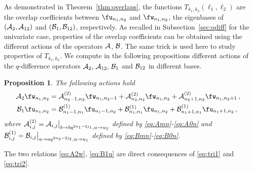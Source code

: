 \documentclass[11pt]{amsart}
\numberwithin{equation}{section}
\newtheorem{prop}[thm]{Proposition}
\numberwithin{equation}{section}
\begin{document}
As demonstrated in Theorem~\ref{thm:overlaps}, the functions $T_{k_1,k_2}(\ell_1,\ell_2)$ are the overlap coefficients between $\fu_{n_1,n_2}$ and $\fw_{n_1,n_2}$, the eigenbases  of $({\cal A}_2,{\cal A}_{12})$ and $({\cal B}_1,{\cal B}_{12})$, respectively. 
As recalled in Subsection~\ref{sec:qdiff} for the univariate case, properties of the overlap coefficients can be obtained using the different actions of the  operators $\cal A$, $\cal B$. The same trick is used here to study properties of   $T_{k_1,k_2}$. 
We compute in the following propositions different actions of the $q$-difference operators  ${\cal A}_2,\, {\cal A}_{12},\,{\cal B}_1$ and ${\cal B}_{12}$ in different bases.
\begin{prop}
   The following actions hold
    \begin{align}
\label{eq:A2w}      {\cal A}_2  \fw_{n_1,n_2}&= {\cal A}^{(2)}_{n_2-1,n_2} \fw_{n_1,n_2-1}+{\cal A}^{(2)}_{n_2,n_2}\fw_{n_1,n_2}+{\cal A}^{(2)}_{n_2+1,n_2}\fw_{n_1,n_2+1}\,,\\
\label{eq:B1u}      {\cal B}_1    \fu_{n_1,n_2} &= {\cal B}^{(1)}_{n_1-1,n_1} \fu_{n_1-1,n_2}+{\cal B}^{(1)}_{n_1,n_1} \fu_{n_1,n_2}+{\cal B}^{(1)}_{n_1+1,n_1} \fu_{n_1+1,n_2}\,,
    \end{align}
    where ${\cal A}^{(2)}_{i,j}={\cal A}_{i,j}\big|_{b\to bq^{2n_1-2j_1},u\to u_2}$ defined by \eqref{eq:Amn}-\eqref{eq:A0n} and  ${\cal B}^{(1)}_{i,j}={\cal B}_{i,j}\big|_{a\to aq^{2n_2-2j_2},u\to u_1}$ defined by \eqref{eq:Bmn}-\eqref{eq:B0n}.
\end{prop}
\proof  The two relations \eqref{eq:A2w}, \eqref{eq:B1u} are direct consequences of \eqref{eq:tri1} and \eqref{eq:tri2}. \endproof
\end{document}
